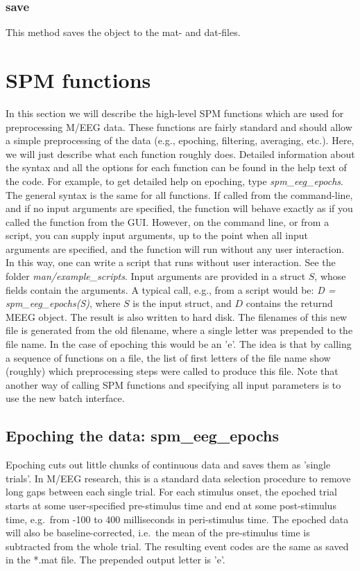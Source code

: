 \subsubsection{save}
This method saves the object to the mat- and dat-files.


\section{SPM functions}
In this section we will describe the high-level SPM functions which
are used for preprocessing M/EEG data. These functions are fairly
standard and should allow a simple preprocessing of the data (e.g.,
epoching, filtering, averaging, etc.). Here, we will just describe
what each function roughly does. Detailed information about the
syntax and all the options for each function can be found in the help
text of the code. For example, to get detailed help on epoching, type
\textit{spm\_eeg\_epochs}. The general syntax is the same for all
functions. If called from the command-line, and if no input arguments
are specified, the function will behave exactly as if you called the
function from the GUI. However, on the command line, or from a script,
you can supply input arguments, up to the point when all input
arguments are specified, and the function will run without any user
interaction. In this way, one can write a script that runs without
user interaction. See the folder \textit{man/example\_scripts}. Input
arguments are provided in a struct $S$, whose 
fields contain the arguments. A typical call, e.g., from a script
would be: \textit{D = spm\_eeg\_epochs(S)}, where $S$ is the input
struct, and $D$ contains the returnd MEEG object. The result is also
written to hard disk. The filenames of this new file is generated from
the old filename, where a single letter was prepended to the file
name. In the case of epoching this would be an 'e'. The idea is that
by calling a sequence of functions on a file, the list of first
letters of the file name show (roughly) which preprocessing steps were
called to produce this file. Note that another way of calling SPM
functions and specifying all input parameters is to use the new batch
interface.

\subsection{Epoching the data: spm\_eeg\_epochs}
Epoching cuts out little chunks of continuous data and saves them as
'single trials'. In M/EEG research, this is a standard data selection
procedure to remove long gaps between each single trial. For each
stimulus onset, the epoched trial starts at some user-specified
pre-stimulus time and 
end at some post-stimulus time, e.g.~from -100 to 400 milliseconds in
peri-stimulus time. The epoched data will also be baseline-corrected,
i.e.~the mean of the pre-stimulus time is subtracted from the whole
trial. The resulting event codes are the same as saved in the *.mat
file. The prepended output letter is 'e'.


